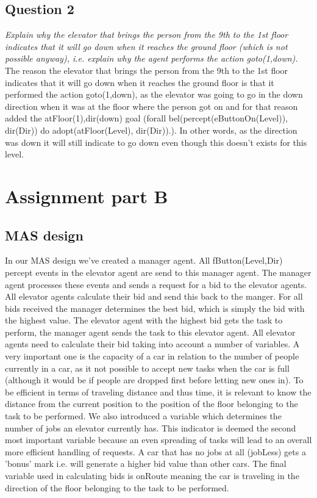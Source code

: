 \documentclass[a4paper,11pt]{article}
\begin{document}
\pagebreak
\subsection{Question 2}

\textit{Explain why the elevator that brings the person from the 9th to the 1st floor indicates that it will go down when it reaches the ground floor (which is not possible anyway), i.e. explain why the agent performs the action goto(1,down).}
\newline\newline
The reason the elevator that brings the person from the 9th to the 1st floor indicates that it will go down when it reaches the ground floor is that it performed the action goto(1,down), as the elevator was going to go in the down direction when it was at the floor where the person got on and for that reason added the atFloor(1),dir(down) goal (forall bel(percept(eButtonOn(Level)), dir(Dir)) do adopt(atFloor(Level), dir(Dir)).). In other words, as the direction was down it will still indicate to go down even though this doesn't exists for this level.

\section{Assignment part B}

\subsection{MAS design}
In our MAS design we've created a manager agent. All fButton(Level,Dir) percept events in the elevator agent are send to this manager agent. The manager agent processes these events and sends a request for a bid to the elevator agents. All elevator agents calculate their bid and send this back to the manger. For all bids received the manager determines the best bid, which is simply the bid with the highest value. The elevator agent with the highest bid gets the task to perform, the manager agent sends the task to this elevator agent. 
\newline\newline
All elevator agents need to calculate their bid taking into account a number of variables. A very important one is the capacity of a car in relation to the number of people currently in a car, as it not possible to accept new tasks when the car is full (although it would be if people are dropped first before letting new ones in). To be efficient in terms of traveling distance and thus time, it is relevant to know the distance from the current position to the position of the floor belonging to the task to be performed. We also introduced a variable which determines the number of jobs an elevator currently has. This indicator is deemed the second most important variable because an even spreading of tasks will lead to an overall more efficient handling of requests. A car that has no jobs at all (jobLess) gets a 'bonus' mark i.e. will generate a higher bid value than other cars. The final variable used in calculating bids is onRoute meaning the car is traveling in the direction of the floor belonging to the task to be performed. 
\end{document}
